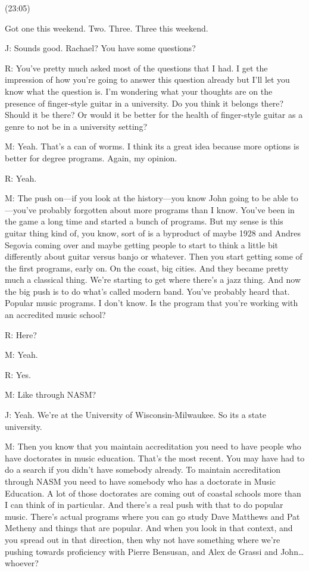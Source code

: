 \documentclass[11pt]{article}
\begin{document}
(23:05)

Got one this weekend. Two. Three. Three this weekend.

J: Sounds good. Rachael? You have some questions?

R: You've pretty much asked most of the questions that I had. I get the impression of how you're going to answer this question already but I'll let you know what the question is. I'm wondering what your thoughts are on the presence of finger-style guitar in a university. Do you think it belongs there? Should it be there? Or would it be better for the health of finger-style guitar as a genre to not be in a university setting?

M: Yeah. That's a can of worms. I think its a great idea because more options is better for degree programs. Again, my opinion. 

R: Yeah.

M: The push on—if you look at the history—you know John going to be able to—you've probably forgotten about more programs than I know. You've been in the game a long time and started a bunch of programs.  But my sense is this guitar thing kind of, you know, sort of is a byproduct of maybe 1928 and Andres Segovia coming over and maybe getting people to start to think a little bit differently about guitar versus banjo or whatever. Then you start getting some of the first programs, early on. On the coast, big cities. And they became pretty much a classical thing. We're starting to get where there's a jazz thing. And now the big push is to do what's called modern band. You've probably heard that. Popular music programs. I don't know. Is the program that you're working with an accredited music school? 

R: Here?

M: Yeah.

R: Yes. 

M: Like through NASM?

J: Yeah. We're at the University of Wisconsin-Milwaukee. So its a state university. 

M: Then you know that you maintain accreditation you need to have people who have doctorates in music education. That's the most recent. You may have had to do a search if you didn't have somebody already. To maintain accreditation through NASM you need to have somebody who has a doctorate in Music Education. A lot of those doctorates are coming out of coastal schools more than I can think of in particular. And there's a real push with that to do popular music. There's actual programs where you can go study Dave Matthews and Pat Metheny and things that are popular. And when you look in that context, and you spread out in that direction, then why not have something where we're pushing towards proficiency with Pierre Bensusan, and Alex de Grassi and John\ldots{}whoever? 
\end{document}
